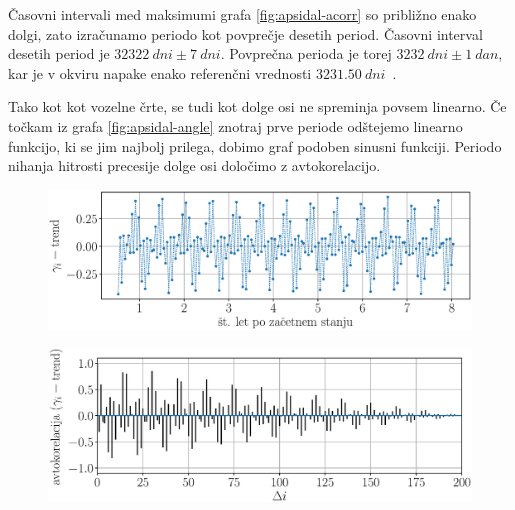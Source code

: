 \documentclass[a4paper,12pt]{article}
\begin{document}
\noindent
Časovni intervali med maksimumi grafa \ref{fig:apsidal-acorr} so približno 
enako dolgi, zato \linebreak 
izračunamo periodo kot povprečje desetih period. Časovni interval desetih 
period je $\SI{32322}{dni}\pm\SI{7}{dni}$. Povprečna perioda je torej 
$\SI{3232}{dni}\pm\SI{1}{dan}$, kar je v okviru napake enako 
referenčni vrednosti $\SI{3231.50}{dni}$~\cite{nasassd}.

Tako kot kot vozelne črte, se tudi kot dolge osi ne spreminja povsem linearno.
Če točkam iz grafa \ref{fig:apsidal-angle} znotraj prve periode odštejemo
linearno funkcijo, ki se jim najbolj prilega, dobimo graf podoben sinusni 
funkciji. Periodo nihanja hitrosti precesije dolge osi določimo z 
avtokorelacijo.

\newpage

\begin{figure}[h!]
    \centering
    \includegraphics[scale=0.55]{slikep/apsidal-angle-detrend.eps}
\end{figure}

\begin{figure}[h!]
    \centering
    \includegraphics[scale=0.55]{slikep/apsidal-angle-detrend-acorr.eps}
\end{figure}
\end{document}
